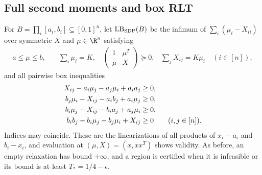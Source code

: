 \subsection{Full second moments and box RLT}
For $B=\prod_i[a_i,b_i]\subseteq[0,1]^n$, let
$\operatorname{LB}_{\rm SDP}(B)$ be the infimum of
$\sum_i(\mu_i-X_{ii})$ over symmetric $X$ and $\mu\in\R^n$ satisfying
\begin{align}
 a\le\mu\le b,\quad &\sum_i\mu_i=K,\quad
 \begin{pmatrix}1&\mu^T\\\mu&X\end{pmatrix}\succeq0,
 &\sum_jX_{ij}=K\mu_i\quad(i\in[n]),\label{eq:sdp-model}
\end{align}
and all pairwise box inequalities
\begin{align}
 X_{ij}-a_i\mu_j-a_j\mu_i+a_ia_j&\ge0,\notag\\
 b_j\mu_i-X_{ij}-a_ib_j+a_i\mu_j&\ge0,\notag\\
 b_i\mu_j-X_{ij}-b_ia_j+a_j\mu_i&\ge0,\notag\\
 b_ib_j-b_i\mu_j-b_j\mu_i+X_{ij}&\ge0
 \qquad(i,j\in[n]).\label{eq:box-rlt}
\end{align}
Indices may coincide. These are the linearizations of all products of
$x_i-a_i$ and $b_i-x_i$, and evaluation at $(\mu,X)=(x,xx^T)$ shows
validity. As before, an empty relaxation has bound $+\infty$, and a
region is certified when it is infeasible or its bound is at least
$T_*=1/4-\epsilon$.

